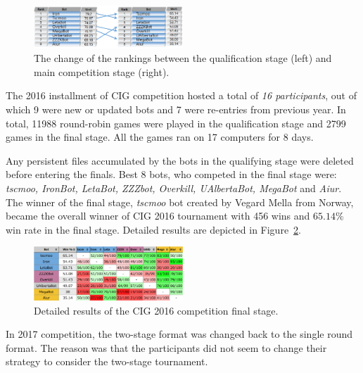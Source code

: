 \begin{figure}[h]
  \centering
  \includegraphics[width=0.5\textwidth]{fig/cig-two-stage-result.png}
  \caption{The change of the rankings between the qualification stage (left) and main competition stage (right).}
  \label{figCIGtwostages}
\end{figure}

The 2016 installment of CIG competition hosted a total of {\em 16 participants}, out of which 9 were new or updated bots and 7 were re-entries from previous year. 
In total, 11988 round-robin games were played in the qualification stage and 2799 games in the final stage. 
All the games ran on 17 computers for 8 days. 

Any persistent files accumulated by the bots in the qualifying stage were deleted before entering the finals. 
Best 8 bots, who competed in the final stage were: {\em tscmoo, IronBot, LetaBot, ZZZbot, Overkill, UAlbertaBot, MegaBot} and {\em Aiur}.
The winner of the final stage, {\em tscmoo} bot created by Vegard Mella from Norway, became the overall winner of CIG 2016 tournament with 456 wins and $65.14\%$ win rate in the final stage. Detailed results are depicted in Figure~\ref{figCIGresults}. 

\begin{figure}[h]
  \centering
  \includegraphics[width=0.5\textwidth]{fig/cig-results.png}
  \caption{Detailed results of the CIG 2016 competition final stage.}
  \label{figCIGresults}
\end{figure}

In 2017 competition, the two-stage format was changed back to the single round format. The reason was that the participants did not seem to change their strategy to consider the two-stage tournament. 

